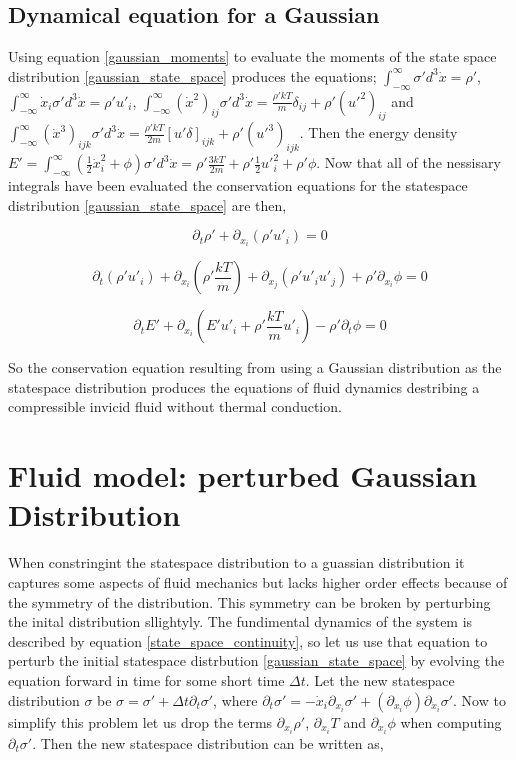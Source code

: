 \documentclass[%
 twocolumn,
 amsmath,amssymb,
 aps,
]{revtex4-1}
\newcommand{\intVdot}[1]{\int_{-\infty}^{\infty} #1 d^3\dot{x}}
\begin{document}
\subsection{Dynamical equation for a Gaussian}
Using equation \eqref{gaussian_moments} to evaluate the moments of the state space distribution \eqref{gaussian_state_space} produces the equations; $\intVdot{\sigma'}=\rho'$, $\intVdot{\dot{x}_i\sigma'}=\rho' u'_i$, $\intVdot{\left(\dot{x}^2\right)_{ij}\sigma'}=\frac{\rho'kT}{m}\delta_{ij} + \rho'\left(u'^2\right)_{ij}$ and $\intVdot{\left(\dot{x}^3\right)_{ijk}\sigma'}=\frac{\rho'kT}{2m}\left[u'\delta\right]_{ijk} + \rho'\left(u'^3\right)_{ijk}$. Then the energy density $E'=\intVdot{\left(\frac{1}{2}\dot{x}_i^2 + \phi\right)\sigma'}=\rho'\frac{3kT}{2m}+\rho'\frac{1}{2}{u'}_i^2+\rho'\phi$. Now that all of the nessisary integrals have been evaluated the conservation equations for the statespace distribution \eqref{gaussian_state_space} are then,

\[
\partial_t \rho' + \partial_{x_i}\left(\rho'u'_i\right)=0
\]

\[
\partial_t \left(\rho' u'_i\right) + \partial_{x_i}\left(\rho'\frac{kT}{m}\right) + \partial_{x_j}\left(\rho'u'_iu'_j\right) + \rho'\partial_{x_i}\phi = 0
\]

\[
\partial_t E' + \partial_{x_i}\left(E'u'_i + \rho'\frac{kT}{m}u'_i\right)-\rho'\partial_t\phi = 0
\]

So the conservation equation resulting from using a Gaussian distribution as the statespace distribution produces the equations of fluid dynamics destribing a compressible invicid fluid without thermal conduction.

\section{Fluid model: perturbed Gaussian Distribution}
When constringint the statespace distribution to a guassian distribution it captures some aspects of fluid mechanics but lacks higher order effects because of the symmetry of the distribution. This symmetry can be broken by perturbing the inital distribution sllightyly. The fundimental dynamics of the system is described by equation \eqref{state_space_continuity}, so let us use that equation to perturb the initial statespace distrbution \eqref{gaussian_state_space} by evolving the equation forward in time for some short time $\Delta t$. Let the new statespace distribution $\sigma$ be $\sigma=\sigma' + \Delta t\partial_t \sigma'$, where $\partial_t \sigma'=-\dot{x}_i\partial_{x_i}\sigma'+\left(\partial_{x_i}\phi\right)\partial_{\dot{x}_i}\sigma'$. Now to simplify this problem let us drop the terms $\partial_{x_i}\rho'$, $\partial_{x_i}T$ and $\partial_{x_i}\phi$ when computing $\partial_t \sigma'$. Then the new statespace distribution can be written as,
\end{document}
